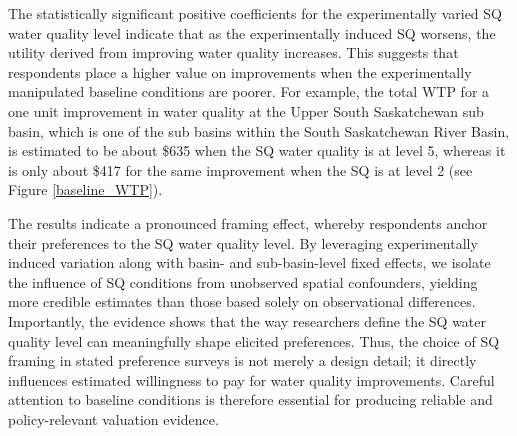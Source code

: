 \documentclass[12pt]{article}
\begin{document}
The statistically significant positive coefficients for the experimentally varied SQ water quality level indicate that as the 
experimentally induced SQ worsens, the utility derived from improving water quality increases. This suggests that respondents place a higher 
value on improvements when the experimentally manipulated baseline conditions are poorer. For example, the total WTP for a one unit 
improvement in water quality at the Upper South Saskatchewan sub basin, which is one of the sub basins within the South Saskatchewan 
River Basin, is estimated to be about \$635 when the SQ water quality is at level 5, whereas it is only about \$417 for the same 
improvement when the SQ is at level 2 (see Figure \ref{baseline_WTP}).


The results indicate a pronounced framing effect, whereby respondents anchor their preferences to the SQ water quality level. By 
leveraging experimentally induced variation along with basin- and sub-basin-level fixed effects, we isolate the influence of SQ conditions 
from unobserved spatial confounders, yielding more credible estimates than those based solely on observational differences. Importantly, 
the evidence shows that the way researchers define the SQ water quality level can meaningfully shape elicited preferences. Thus, the 
choice of SQ framing in stated preference surveys is not merely a design detail; it directly influences estimated willingness to pay for 
water quality improvements. Careful attention to baseline conditions is therefore essential for producing reliable and policy-relevant 
valuation evidence.









\end{document}
